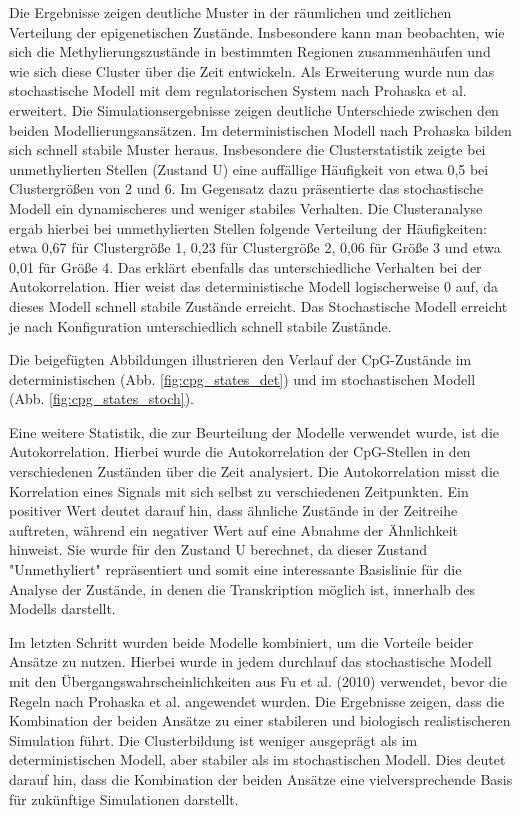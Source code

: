 \documentclass{SeminarV2}
\begin{document}
Die Ergebnisse zeigen deutliche Muster in der r\"{a}umlichen und zeitlichen 
Verteilung der epigenetischen Zust\"{a}nde. Insbesondere kann man beobachten, wie sich die Methylierungszust\"{a}nde in bestimmten Regionen zusammenh\"{a}ufen und wie sich diese Cluster \"{u}ber die Zeit entwickeln.
Als Erweiterung wurde nun das stochastische Modell mit dem regulatorischen System nach Prohaska et al. erweitert.
Die Simulationsergebnisse zeigen deutliche Unterschiede zwischen den beiden Modellierungsansätzen. Im deterministischen Modell nach Prohaska bilden sich schnell stabile Muster heraus. Insbesondere die Clusterstatistik zeigte bei unmethylierten Stellen (Zustand U) eine auffällige Häufigkeit von etwa 0,5 bei Clustergrößen von 2 und 6.
Im Gegensatz dazu präsentierte das stochastische Modell ein dynamischeres und weniger stabiles Verhalten. Die Clusteranalyse ergab hierbei bei unmethylierten Stellen folgende Verteilung der Häufigkeiten: etwa 0,67 für Clustergröße 1, 0,23 für Clustergröße 2, 0,06 für Größe 3 und etwa 0,01 für Größe 4.
Das erklärt ebenfalls das unterschiedliche Verhalten bei der Autokorrelation. Hier weist das deterministische Modell logischerweise 0 auf, da dieses Modell schnell stabile Zustände erreicht. Das Stochastische Modell erreicht je nach Konfiguration unterschiedlich schnell stabile Zustände.

Die beigefügten Abbildungen illustrieren den Verlauf der CpG-Zustände im deterministischen (Abb. \ref{fig:cpg_states_det}) und im stochastischen Modell (Abb. \ref{fig:cpg_states_stoch}).

Eine weitere Statistik, die zur Beurteilung der Modelle verwendet wurde, ist die Autokorrelation.
Hierbei wurde die Autokorrelation der CpG-Stellen in den verschiedenen Zuständen über die Zeit analysiert.
Die Autokorrelation misst die Korrelation eines Signals mit sich selbst zu verschiedenen Zeitpunkten. Ein positiver Wert deutet darauf hin, dass ähnliche Zustände in der Zeitreihe auftreten, während ein negativer Wert auf eine Abnahme der Ähnlichkeit hinweist.
Sie wurde für den Zustand U berechnet, da dieser Zustand "Unmethyliert" repräsentiert und somit eine interessante Basislinie für die Analyse der Zustände, in denen die Transkription möglich ist, innerhalb des Modells darstellt.

Im letzten Schritt wurden beide Modelle kombiniert, um die Vorteile beider Ansätze zu nutzen.
Hierbei wurde in jedem durchlauf das stochastische Modell mit den Übergangswahrscheinlichkeiten aus Fu et al. (2010) verwendet, bevor die Regeln nach Prohaska et al. angewendet wurden.
Die Ergebnisse zeigen, dass die Kombination der beiden Ansätze zu einer stabileren und biologisch realistischeren Simulation führt. Die Clusterbildung ist weniger ausgeprägt als im deterministischen Modell, aber stabiler als im stochastischen Modell. Dies deutet darauf hin, dass die Kombination der beiden Ansätze eine vielversprechende Basis für zukünftige Simulationen darstellt.
\end{document}
